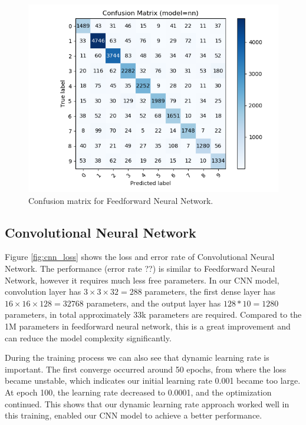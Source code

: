 \documentclass[journal]{IEEEtran}
\begin{document}
\begin{figure}[htb]
\includegraphics[width=\linewidth]{images/nn-cm.png}
\caption{Confusion matrix for Feedforward Neural Network.}\label{fig:nn_cm}
\end{figure}


\subsection{Convolutional Neural Network}

Figure \ref{fig:cnn_loss} shows the loss and error rate of Convolutional Neural Network. The performance (error rate ??) is similar to Feedforward Neural Network, however it requires much less free parameters. In our CNN model, convolution layer has $3 \times 3 \times 32 = 288$ parameters, the first dense layer has $16 \times 16 \times 128 = 32768$ parameters, and the output layer has $128 * 10 = 1280$ parameters, in total approximately 33k parameters are required. Compared to the 1M parameters in feedforward neural network, this is a great improvement and can reduce the model complexity significantly.

During the training process we can also see that dynamic learning rate is important. The first converge occurred around 50 epochs, from where the loss became unstable, 
which indicates our initial learning rate 0.001 became too large.
At epoch 100, the learning rate decreased to 0.0001,
and the optimization continued. This shows that our dynamic learning rate approach worked well in this training, enabled our CNN model to achieve a better performance.
\end{document}
